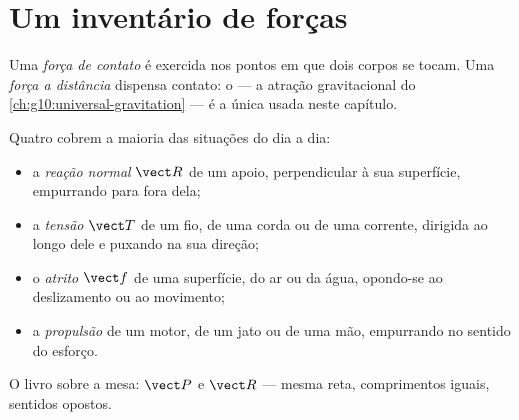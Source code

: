 \section{Um inventário de forças}

\begin{definition}\label{def:g10:inertia:contact}
Uma \emph{força de contato} é exercida nos pontos
em que dois corpos se tocam. Uma \emph{força a distância} dispensa contato: o  --- a atração gravitacional do
\cref{ch:g10:universal-gravitation} --- é a única usada neste capítulo.
\end{definition}

\begin{definition}\label{def:g10:inertia:inventory}
Quatro  cobrem a maioria das situações do dia a dia:
\begin{itemize}
  \item a \emph{reação normal} $\vect R$ de um
        apoio, perpendicular à sua superfície, empurrando para fora dela;
  \item a \emph{tensão} $\vect T$ de um fio, de uma corda
        ou de uma corrente, dirigida ao longo dele e puxando na sua
        direção;
  \item o \emph{atrito} $\vect f$ de uma superfície, do ar
        ou da água, opondo-se ao deslizamento ou ao movimento;
  \item a \emph{propulsão} de um motor, de um jato ou de
        uma mão, empurrando no sentido do esforço.
\end{itemize}
\end{definition}

\begin{omfigure}

{\small O livro sobre a mesa:  $\vect P$ e  $\vect R$
--- mesma reta, comprimentos iguais, sentidos opostos.}
\end{omfigure}

